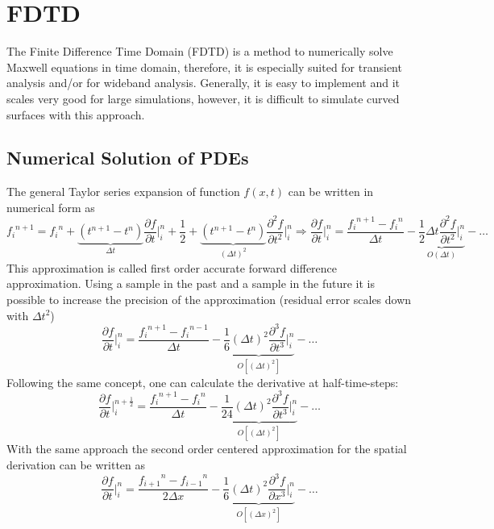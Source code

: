 \section{FDTD}
The Finite Difference Time Domain (FDTD) is a method to numerically solve Maxwell equations in time domain, therefore, it is especially suited for transient analysis and/or for wideband analysis. Generally, it is easy to implement and it scales very good for large simulations, however, it is difficult to simulate curved surfaces with this approach.

\subsection{Numerical Solution of PDEs}
The general Taylor series expansion of function $f(x,t)$ can be written in numerical form as 
\begin{equation*}
	{f_i}^{n+1}= {f_i}^n + \underbrace{\left(t^{n+1} - t^n\right)}_{\Delta t} \frac{\partial f}{\partial t} \bigg\rvert_{i}^{n} + \frac{1}{2} + \underbrace{\left(t^{n+1} - t^n\right)}_{\left(\Delta t\right)^2} \frac{\partial^2f}{\partial t^2} \bigg\rvert_{i}^{n} \Rightarrow \frac{\partial f}{\partial t} \bigg\rvert_{i}^{n} = \frac{{f_i}^{n+1}-{f_i}^n}{\Delta t} - \underbrace{\frac{1}{2}\Delta t \frac{\partial ^2 f}{\partial t^2}\bigg\rvert_{i}^{n}}_{O(\Delta t)} - \dots
\end{equation*}
This approximation is called first order accurate forward difference approximation. \newline Using a sample in the past and a sample in the future it is possible to increase the precision of the approximation (residual error scales down with $\Delta t^2$)
\begin{equation*}
	\frac{\partial f}{\partial t} \bigg\rvert_{i}^{n} = \frac{{f_i}^{n+1}-{f_i}^{n-1}}{\Delta t} - \underbrace{\frac{1}{6}\left(\Delta t\right)^2 \frac{\partial ^3 f}{\partial t^3}\bigg\rvert_{i}^{n}}_{O\left[(\Delta t)^2\right]} - \dots
\end{equation*}
Following the same concept, one can calculate the derivative at half-time-steps:
\begin{equation*}
	\frac{\partial f}{\partial t} \bigg\rvert_{i}^{n+\frac{1}{2}} = \frac{{f_i}^{n+1}-{f_i}^{n}}{\Delta t} - \underbrace{\frac{1}{24}\left(\Delta t\right)^2 \frac{\partial ^3 f}{\partial t^3}\bigg\rvert_{i}^{n}}_{O\left[(\Delta t)^2\right]} - \dots
\end{equation*}
With the same approach the second order centered approximation for the spatial derivation can be written as
\begin{equation*}
	\frac{\partial f}{\partial t} \bigg\rvert_{i}^{n} = \frac{{f_{i+1}}^{n}-{f_{i-1}}^{n}}{2\Delta x} - \underbrace{\frac{1}{6}\left(\Delta t\right)^2 \frac{\partial ^3 f}{\partial x^3}\bigg\rvert_{i}^{n}}_{O\left[(\Delta x)^2\right]} - \dots
\end{equation*}

